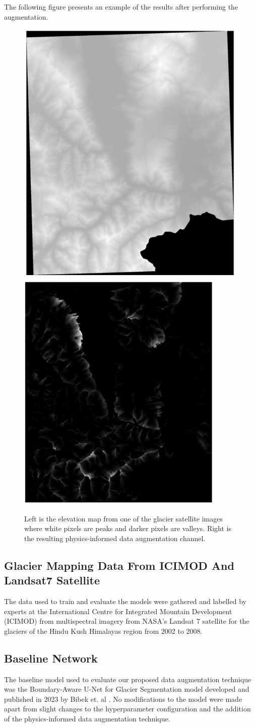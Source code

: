 The following figure presents an example of the results after performing the augmentation.
\begin{figure}[H] \centering
    \includegraphics[width=0.45\linewidth]{figures/data_augmentation_dem.png}
    \includegraphics[width=0.45\linewidth]{figures/data_augmentation_result.png}
    \caption{Left is the elevation map from one of the glacier satellite images where white pixels are peaks and darker pixels are valleys. Right is the resulting physics-informed data augmentation channel.}
    \label{fig:data_augmentation_result}
\end{figure}


\subsection{Glacier Mapping Data From ICIMOD And Landsat7 Satellite}
The data used to train and evaluate the models were gathered and labelled by experts at the International Centre for Integrated Mountain Development (ICIMOD) from multispectral imagery from NASA's Landsat 7 satellite for the glaciers of the Hindu Kush Himalayas region from 2002 to 2008. 

\subsection{Baseline Network}
The baseline model used to evaluate our proposed data augmentation technique was the Boundary-Aware U-Net for Glacier Segmentation model developed and published in 2023 by Bibek et. al \cite{Bibek2023}. No modifications to the model were made apart from slight changes to the hyperparameter configuration and the addition of the physics-informed data augmentation technique.

